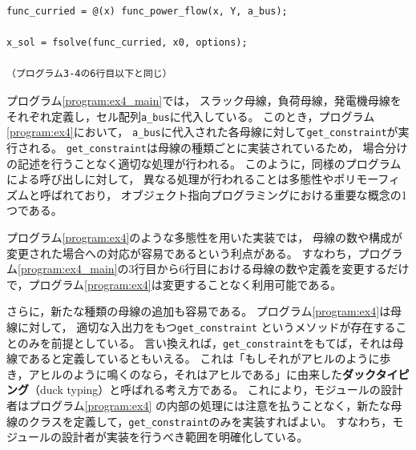 \documentclass[tombow,dvipdfmx]{corona-a5-1.1}
\begin{document}
\begin{例}[多態性を用いた潮流計算の実装例]
\begin{PROGRAMA}[count,title={main\_ex4.m}]
\begin{verbatim}
func_curried = @(x) func_power_flow(x, Y, a_bus);

x_sol = fsolve(func_curried, x0, options);

（プログラム3-4の6行目以下と同じ）
\end{verbatim}
\end{PROGRAMA}

プログラム\nobreak\ref{program:ex4_main}では，
スラック母線，負荷母線，発電機母線を
それぞれ定義し，セル配列\verb|a_bus|に代入している。
このとき，プログラム\nobreak\ref{program:ex4}において，
\verb|a_bus|に代入された各母線に対して\verb|get_constraint|が実行される。
\verb|get_constraint|は母線の種類ごとに実装されているため，
場合分けの記述を行うことなく適切な処理が行われる。
このように，同様のプログラムによる呼び出しに対して，
異なる処理が行われることは{多態性}や{ポリモーフィズム}と呼ばれており，
オブジェクト指向プログラミングにおける重要な概念の1つである。

プログラム\nobreak\ref{program:ex4}のような多態性を用いた実装では，
母線の数や構成が変更された場合への対応が容易であるという利点がある。
すなわち，プログラム\nobreak\ref{program:ex4_main}の3行目から6行目における母線の数や定義を変更するだけで，プログラム\nobreak\ref{program:ex4}は変更することなく利用可能である。

さらに，新たな種類の母線の追加も容易である。
プログラム\nobreak\ref{program:ex4}は母線に対して，
適切な入出力をもつ\verb|get_constraint|
というメソッドが存在することのみを前提としている。
言い換えれば，\verb|get_constraint|をもてば，それは母線であると定義しているともいえる。
これは「もしそれがアヒルのように歩き，アヒルのように鳴くのなら，それはアヒルである」に由来した\textbf{ダックタイピング}（duck typing）と呼ばれる考え方である。
これにより，モジュールの設計者はプログラム\nobreak\ref{program:ex4}
の内部の処理には注意を払うことなく，新たな母線のクラスを定義して，\verb|get_constraint|のみを実装すればよい。
すなわち，モジュールの設計者が実装を行うべき範囲を明確化している。

\end{例}
\end{document}
